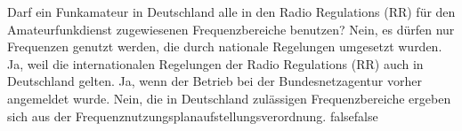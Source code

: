     {Darf ein Funkamateur in Deutschland alle in den Radio Regulations (RR) für den Amateurfunkdienst zugewiesenen Frequenzbereiche benutzen?}
    {Nein, es dürfen nur Frequenzen genutzt werden, die durch nationale Regelungen umgesetzt wurden.}
    {Ja, weil die internationalen Regelungen der Radio Regulations (RR) auch in Deutschland gelten.}
    {Ja, wenn der Betrieb bei der Bundesnetzagentur vorher angemeldet wurde.}
    {Nein, die in Deutschland zulässigen Frequenzbereiche ergeben sich aus der Frequenznutzungsplanaufstellungsverordnung.}
    {false}{false}